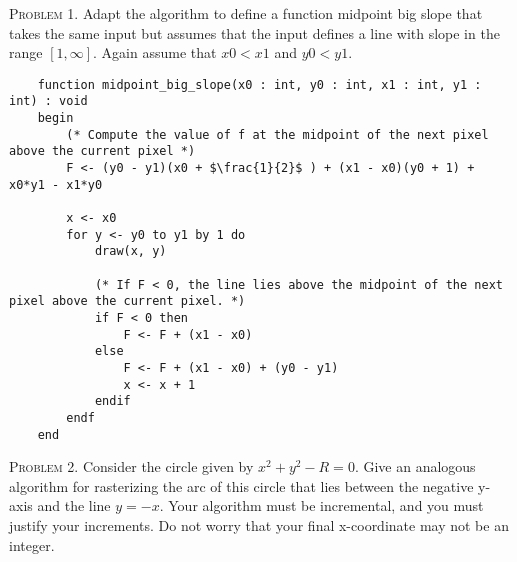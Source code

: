 \documentclass[a4paper, 12pt]{article}
\begin{document}

\textsc{Problem 1.} Adapt the algorithm to define a function midpoint big slope that takes the same input
but assumes that the input defines a line with slope in the range $[1, \infty]$. Again assume that $x0 < x1$
and $y0 < y1$.

\begin{lstlisting}
    function midpoint_big_slope(x0 : int, y0 : int, x1 : int, y1 : int) : void
    begin
        (* Compute the value of f at the midpoint of the next pixel above the current pixel *)
        F <- (y0 - y1)(x0 + $\frac{1}{2}$ ) + (x1 - x0)(y0 + 1) + x0*y1 - x1*y0

        x <- x0
        for y <- y0 to y1 by 1 do
            draw(x, y)

            (* If F < 0, the line lies above the midpoint of the next pixel above the current pixel. *)
            if F < 0 then
                F <- F + (x1 - x0)
            else
                F <- F + (x1 - x0) + (y0 - y1)
                x <- x + 1
            endif
        endf
    end
\end{lstlisting}

\textsc{Problem 2.} Consider the circle given by $x^2 + y^2 - R = 0$. Give an analogous algorithm for
rasterizing the arc of this circle that lies between the negative y-axis and the line $y = -x$. Your
algorithm must be incremental, and you must justify your increments. Do not worry that your
final x-coordinate may not be an integer.\\
\end{document}
